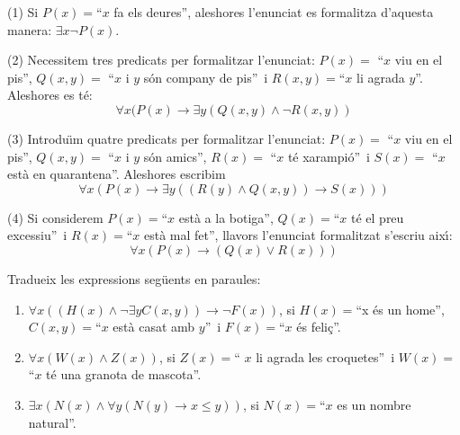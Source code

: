 \begin{solucio}
(1) Si $P(x)=$\textquotedblleft$x$ fa els deures\textquotedblright, aleshores
l'enunciat es formalitza d'aquesta manera: $\exists x\lnot P(x)$.

(2) Necessitem tres predicats per formalitzar l'enunciat: $P(x)=$%
\textquotedblleft$x$ viu en el pis\textquotedblright, $Q(x,y)=$%
\textquotedblleft$x$ i $y$ s\'{o}n company de pis\textquotedblright\ i
$R(x,y)=$\textquotedblleft$x$ li agrada $y$\textquotedblright. Aleshores es
t\'{e}:%
\[
\forall x(P(x)\longrightarrow\exists y\left(  Q\left(  x,y\right)  \wedge\lnot
R\left(  x,y\right)  \right)
\]


(3) Introdu\"{\i}m quatre predicats per formalitzar l'enunciat: $P(x)=$%
\textquotedblleft$x$ viu en el pis\textquotedblright, $Q(x,y)=$%
\textquotedblleft$x$ i $y$ s\'{o}n amics\textquotedblright, $R(x)=$%
\textquotedblleft$x$ t\'{e} xarampi\'{o}\textquotedblright\ i $S(x)=$%
\textquotedblleft$x$ est\`{a} en quarantena\textquotedblright. Aleshores
escribim%
\[
\forall x\left(  P(x)\longrightarrow\exists y\left(  \left(  R(y)\wedge
Q\left(  x,y\right)  \right)  \longrightarrow S(x)\right)  \right)
\]


(4) Si considerem $P(x)=$\textquotedblleft$x$ est\`{a} a la
botiga\textquotedblright, $Q(x)=$\textquotedblleft$x$ t\'{e} el preu
excessiu\textquotedblright\ i $R(x)=$\textquotedblleft$x$ est\`{a} mal
fet\textquotedblright, llavors l'enunciat formalitzat s'escriu aix\'{\i}:%
\[
\forall x\left(  P(x)\longrightarrow\left(  Q(x)\vee R(x)\right)  \right)
\]

\end{solucio}

\begin{exercici}
Tradueix les expressions seg\"{u}ents en paraules:

\begin{enumerate}
\item $\forall x\left(  \left(  H(x)\wedge\lnot\exists yC(x,y)\right)
\longrightarrow\lnot F(x)\right)  $, si $H(x)=$\textquotedblleft x \'{e}s un
home\textquotedblright, $C(x,y)=$\textquotedblleft$x$ est\`{a} casat amb $y
$\textquotedblright\ i $F(x)=$\textquotedblleft$x$ \'{e}s
feli\c{c}\textquotedblright.

\item $\forall x\left(  W(x)\wedge Z(x)\right)  $, si $Z(x)=$\textquotedblleft%
$x$ li agrada les croquetes\textquotedblright\ i $W(x)=$\textquotedblleft$x$
t\'{e} una granota de mascota\textquotedblright.

\item $\exists x\left(  N(x)\wedge\forall y\left(  N(y)\longrightarrow x\leq
y\right)  \right)  $, si $N(x)=$\textquotedblleft$x$ es un nombre
natural\textquotedblright.
\end{enumerate}
\end{exercici}

